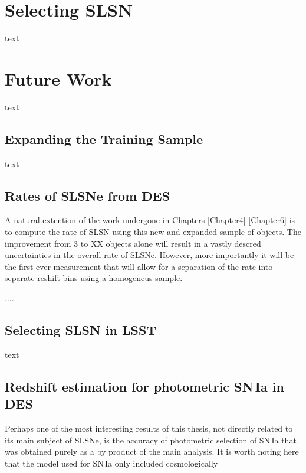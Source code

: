 \section{Selecting SLSN}
text

\section{Future Work}
text

\subsection{Expanding the Training Sample}
text

\subsection{Rates of SLSNe from DES}
A natural extention of the work undergone in Chapters \ref{Chapter4}-\ref{Chapter6} is to compute the rate of SLSN using this new and expanded sample of objects. The improvement from 3 to XX objects alone will result in a vastly descred uncertainties in the overall rate of SLSNe. However, more importantly it will be the first ever measurement that will allow for a separation of the rate into separate reshift bins using a homogeneus sample.

....

\subsection{Selecting SLSN in LSST}
text

\subsection{Redshift estimation for photometric SN\,Ia in DES}
Perhaps one of the most interesting results of this thesis, not directly related to its main subject of SLSNe, is the accuracy of photometric selection of SN\,Ia that was obtained purely as a by product of the main analysis. It is worth noting here that the model used for SN\,Ia only included cosmologically
